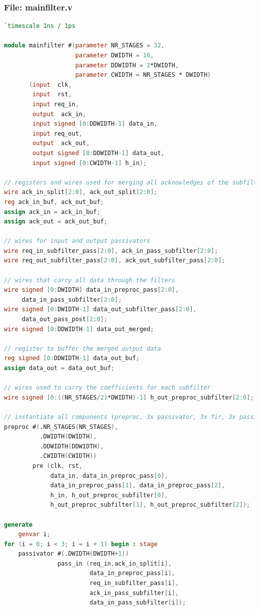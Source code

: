 \documentclass[a4paper,twoside,11pt, fleqn]{article}
\begin{document}
\subsubsection{File: mainfilter.v}
\begin{lstlisting}[language=Verilog]
`timescale 1ns / 1ps

module mainfilter #(parameter NR_STAGES = 32,
                    parameter DWIDTH = 16,
                    parameter DDWIDTH = 2*DWIDTH,
                    parameter CWIDTH = NR_STAGES * DWIDTH)
       (input  clk,
        input  rst,
        input req_in,
        output  ack_in,
        input signed [0:DDWIDTH-1] data_in,
        input req_out,
        output  ack_out,
        output signed [0:DDWIDTH-1] data_out,
        input signed [0:CWIDTH-1] h_in);

// registers and wires used for merging all acknowledges of the subfilters
wire ack_in_split[2:0], ack_out_split[2:0];
reg ack_in_buf, ack_out_buf;
assign ack_in = ack_in_buf;
assign ack_out = ack_out_buf;

// wires for input and output passivators
wire req_in_subfilter_pass[2:0], ack_in_pass_subfilter[2:0];
wire req_out_subfilter_pass[2:0], ack_out_subfilter_pass[2:0];

// wires that carry all data through the filters
wire signed [0:DWIDTH] data_in_preproc_pass[2:0],
     data_in_pass_subfilter[2:0];
wire signed [0:DWIDTH-1] data_out_subfilter_pass[2:0],
     data_out_pass_post[2:0];
wire signed [0:DDWIDTH-1] data_out_merged;

// register to buffer the merged output data
reg signed [0:DDWIDTH-1] data_out_buf;
assign data_out = data_out_buf;

// wires used to carry the coefficients for each subfilter
wire signed [0:((NR_STAGES/2)*DWIDTH)-1] h_out_preproc_subfilter[2:0];

// instantiate all components (preproc, 3x passivator, 3x fir, 3x passivator, postproc)
preproc #(.NR_STAGES(NR_STAGES),
		  .DWIDTH(DWIDTH),
		  .DDWIDTH(DDWIDTH),
		  .CWIDTH(CWIDTH))
        pre (clk, rst,
             data_in, data_in_preproc_pass[0],
             data_in_preproc_pass[1], data_in_preproc_pass[2],
             h_in, h_out_preproc_subfilter[0],
             h_out_preproc_subfilter[1], h_out_preproc_subfilter[2]);

generate
    genvar i;
for (i = 0; i < 3; i = i + 1) begin : stage
    passivator #(.DWIDTH(DWIDTH+1))
               pass_in (req_in,ack_in_split[i],
                        data_in_preproc_pass[i],
                        req_in_subfilter_pass[i],
                        ack_in_pass_subfilter[i],
                        data_in_pass_subfilter[i]);


\end{lstlisting}
\end{document}
